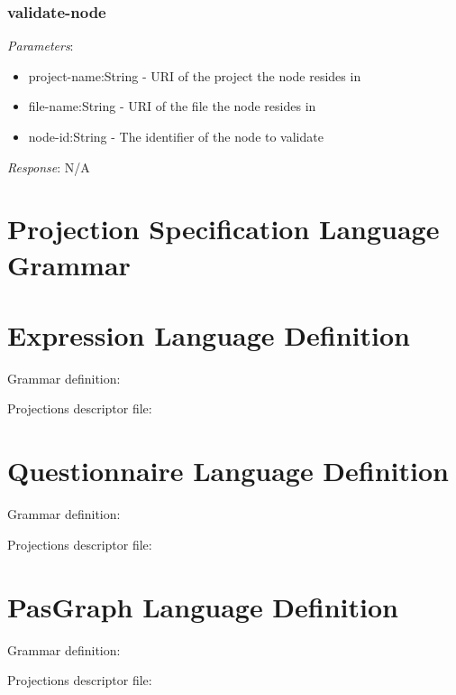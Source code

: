 \documentclass{report}
\begin{document}
\subsubsection{validate-node}

\emph{Parameters}: 
\begin{itemize}
\item project-name:String - URI of the project the node resides in
\item file-name:String - URI of the file the node resides in
\item node-id:String - The identifier of the node to validate
\end{itemize}
\emph{Response}: N/A

\section{Projection Specification Language Grammar}\label{editorLanguageGrammar}


\section{Expression Language Definition}\label{expressionLanguageDef}
Grammar definition:

Projections descriptor file:


\section{Questionnaire Language Definition}\label{questionnaireLanguageDef}
Grammar definition:

Projections descriptor file:



\section{PasGraph Language Definition}\label{pascalLanguageDef}
Grammar definition:

Projections descriptor file:








\end{document}
